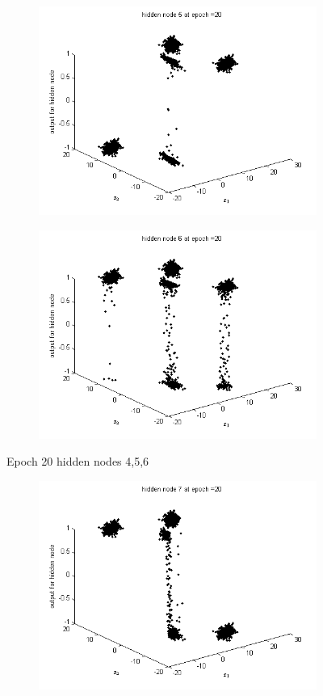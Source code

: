 \documentclass{article}
\begin{document}
\begin{flushleft}
\begin{figure}
\begin{subfigure}{.3\textwidth}
\end{subfigure}%
\begin{subfigure}{.3\textwidth}
  \centering
  \includegraphics[width=.8\linewidth]{Classification/linearlySeparable/h20_5}
  
\end{subfigure}
\begin{subfigure}{.3\textwidth}
  \centering
  \includegraphics[width=.8\linewidth]{Classification/linearlySeparable/h20_6}
  
\end{subfigure}
\caption{Epoch 20 hidden nodes 4,5,6}
\end{figure}

\begin{figure}
\begin{subfigure}{.3\textwidth}
  \centering
  \includegraphics[width=.8\linewidth]{Classification/linearlySeparable/h20_7}
 

\end{subfigure}
\end{figure}
\end{flushleft}
\end{document}
